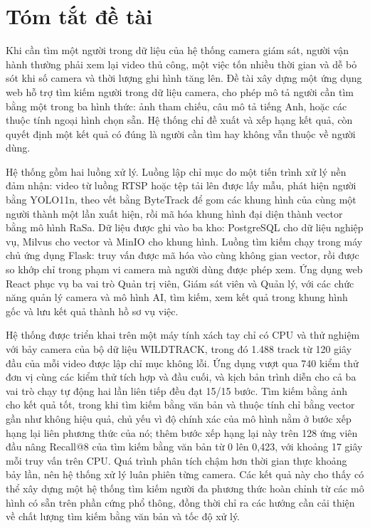 \chapter*{Tóm tắt đề tài}

Khi cần tìm một người trong dữ liệu của hệ thống camera giám sát, người vận hành thường phải xem lại video thủ công, một việc tốn nhiều thời gian và dễ bỏ sót khi số camera và thời lượng ghi hình tăng lên. Đề tài xây dựng một ứng dụng web hỗ trợ tìm kiếm người trong dữ liệu camera, cho phép mô tả người cần tìm bằng một trong ba hình thức: ảnh tham chiếu, câu mô tả tiếng Anh, hoặc các thuộc tính ngoại hình chọn sẵn. Hệ thống chỉ đề xuất và xếp hạng kết quả, còn quyết định một kết quả có đúng là người cần tìm hay không vẫn thuộc về người dùng.

Hệ thống gồm hai luồng xử lý. Luồng lập chỉ mục do một tiến trình xử lý nền đảm nhận: video từ luồng RTSP hoặc tệp tải lên được lấy mẫu, phát hiện người bằng YOLO11n, theo vết bằng ByteTrack để gom các khung hình của cùng một người thành một lần xuất hiện, rồi mã hóa khung hình đại diện thành vector bằng mô hình RaSa. Dữ liệu được ghi vào ba kho: PostgreSQL cho dữ liệu nghiệp vụ, Milvus cho vector và MinIO cho khung hình. Luồng tìm kiếm chạy trong máy chủ ứng dụng Flask: truy vấn được mã hóa vào cùng không gian vector, rồi được so khớp chỉ trong phạm vi camera mà người dùng được phép xem. Ứng dụng web React phục vụ ba vai trò Quản trị viên, Giám sát viên và Quản lý, với các chức năng quản lý camera và mô hình AI, tìm kiếm, xem kết quả trong khung hình gốc và lưu kết quả thành hồ sơ vụ việc.

Hệ thống được triển khai trên một máy tính xách tay chỉ có CPU và thử nghiệm với bảy camera của bộ dữ liệu WILDTRACK, trong đó 1.488 track từ 120 giây đầu của mỗi video được lập chỉ mục không lỗi. Ứng dụng vượt qua 740 kiểm thử đơn vị cùng các kiểm thử tích hợp và đầu cuối, và kịch bản trình diễn cho cả ba vai trò chạy tự động hai lần liên tiếp đều đạt 15/15 bước. Tìm kiếm bằng ảnh cho kết quả tốt, trong khi tìm kiếm bằng văn bản và thuộc tính chỉ bằng vector gần như không hiệu quả, chủ yếu vì độ chính xác của mô hình nằm ở bước xếp hạng lại liên phương thức của nó; thêm bước xếp hạng lại này trên 128 ứng viên đầu nâng Recall@8 của tìm kiếm bằng văn bản từ 0 lên 0,423, với khoảng 17 giây mỗi truy vấn trên CPU. Quá trình phân tích chậm hơn thời gian thực khoảng bảy lần, nên hệ thống xử lý luân phiên từng camera. Các kết quả này cho thấy có thể xây dựng một hệ thống tìm kiếm người đa phương thức hoàn chỉnh từ các mô hình có sẵn trên phần cứng phổ thông, đồng thời chỉ ra các hướng cần cải thiện về chất lượng tìm kiếm bằng văn bản và tốc độ xử lý.